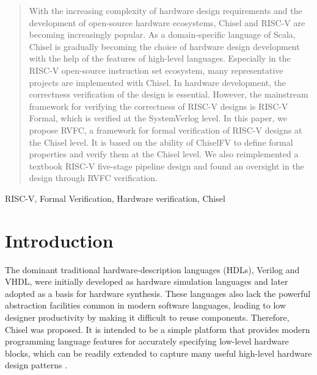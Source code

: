 \documentclass[conference]{IEEEtran}
\theoremstyle{definition}
\begin{document}
\begin{abstract}
    With the increasing complexity of hardware design requirements and the development of open-source hardware ecosystems, Chisel and RISC-V are becoming increasingly popular.
    As a domain-specific language of Scala, Chisel is gradually becoming the choice of hardware design development with the help of the features of high-level languages.
    Especially in the RISC-V open-source instruction set ecosystem, many representative projects are implemented with Chisel.
    In hardware development, the correctness verification of the design is essential.
    However, the mainstream framework for verifying the correctness of RISC-V designs is RISC-V Formal, which is verified at the SystemVerlog level.
    In this paper, we propose RVFC, a framework for formal verification of RISC-V designs at the Chisel level.
    It is based on the ability of ChiselFV to define formal properties and verify them at the Chisel level.
    We also reimplemented a textbook RISC-V five-stage pipeline design and found an oversight in the design through RVFC verification.

\end{abstract}

\begin{IEEEkeywords}
RISC-V, Formal Verification, Hardware verification, Chisel
\end{IEEEkeywords}

\section{Introduction}
The dominant traditional hardware-description languages (HDLs), Verilog and VHDL, were initially developed as hardware simulation languages and later adopted as a basis for hardware synthesis. 
These languages also lack the powerful abstraction facilities common in modern software languages, leading to low designer productivity by making it difficult to reuse components.
Therefore, Chisel was proposed.
It is intended to be a simple platform that provides modern programming language features for accurately specifying low-level hardware blocks, which can be readily extended to capture many useful high-level hardware design patterns \cite{bachrach2012chisel}.
\end{document}
